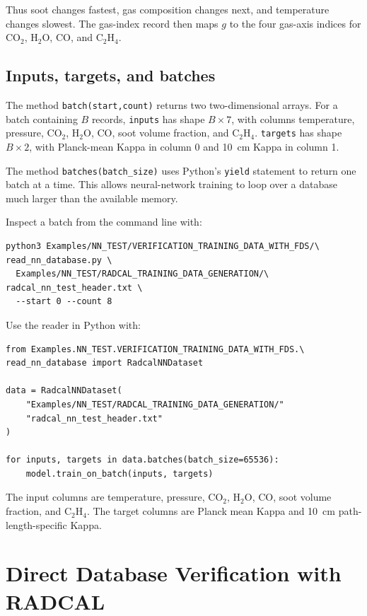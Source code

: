 \documentclass[11pt]{article}
\begin{document}
Thus soot changes fastest, gas composition changes next, and temperature
changes slowest. The gas-index record then maps \(g\) to the four gas-axis
indices for \(\mathrm{CO_2}\), \(\mathrm{H_2O}\), \(\mathrm{CO}\), and
\(\mathrm{C_2H_4}\).

\subsection{Inputs, targets, and batches}

The method \texttt{batch(start,count)} returns two two-dimensional arrays.
For a batch containing \(B\) records, \texttt{inputs} has shape \(B\times7\),
with columns temperature, pressure, \(\mathrm{CO_2}\), \(\mathrm{H_2O}\),
\(\mathrm{CO}\), soot volume fraction, and \(\mathrm{C_2H_4}\).
\texttt{targets} has shape \(B\times2\), with Planck-mean Kappa in column 0
and 10~cm Kappa in column 1.

The method \texttt{batches(batch\_size)} uses Python's \texttt{yield} statement
to return one batch at a time. This allows neural-network training to loop over
a database much larger than the available memory.

Inspect a batch from the command line with:

\begin{verbatim}
python3 Examples/NN_TEST/VERIFICATION_TRAINING_DATA_WITH_FDS/\
read_nn_database.py \
  Examples/NN_TEST/RADCAL_TRAINING_DATA_GENERATION/\
radcal_nn_test_header.txt \
  --start 0 --count 8
\end{verbatim}

Use the reader in Python with:

\begin{verbatim}
from Examples.NN_TEST.VERIFICATION_TRAINING_DATA_WITH_FDS.\
read_nn_database import RadcalNNDataset

data = RadcalNNDataset(
    "Examples/NN_TEST/RADCAL_TRAINING_DATA_GENERATION/"
    "radcal_nn_test_header.txt"
)

for inputs, targets in data.batches(batch_size=65536):
    model.train_on_batch(inputs, targets)
\end{verbatim}

The input columns are temperature, pressure, \(\mathrm{CO_2}\),
\(\mathrm{H_2O}\), \(\mathrm{CO}\), soot volume fraction, and
\(\mathrm{C_2H_4}\). The target columns are Planck mean Kappa and 10~cm
path-length-specific Kappa.

\section{Direct Database Verification with RADCAL}
\end{document}
